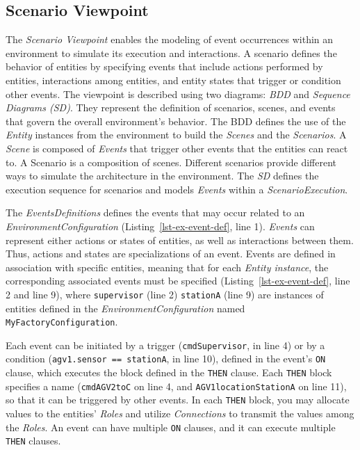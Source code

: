 \subsection{Scenario Viewpoint} \label{vp-sce}

The \textit{Scenario Viewpoint} enables the modeling of event occurrences within an environment to simulate its execution and interactions. A scenario defines the behavior of entities by specifying events that include actions performed by entities, interactions among entities, and entity states that trigger or condition other events. The viewpoint is described using two diagrams: \textit{BDD} and \textit{Sequence Diagrams (SD)}. They represent the definition of scenarios, scenes, and events that govern the overall environment's behavior. The BDD defines the use of the \textit{Entity} instances from the environment to build the \textit{Scenes} and the \textit{Scenarios}. A \textit{Scene} is composed of \textit{Events} that trigger other events that the entities can react to. A Scenario is a composition of scenes. Different scenarios provide different ways to simulate the architecture in the environment. The \textit{SD} defines the execution sequence for scenarios and models \textit{Events} within a \textit{ScenarioExecution}. 

The \textit{EventsDefinitions} defines the events that may occur related to an \textit{EnvironmentConfiguration} (Listing~\ref{lst-ex-event-def}, line 1). \textit{Events} can represent either actions or states of entities, as well as interactions between them. Thus, actions and states are specializations of an event. Events are defined in association with specific entities, meaning that for each \textit{Entity instance}, the corresponding associated events must be specified (Listing~\ref{lst-ex-event-def}, line 2 and line 9), where \texttt{supervisor} (line 2) \texttt{stationA} (line 9) are instances of entities defined in the \textit{EnvironmentConfiguration} named \texttt{MyFactoryConfiguration}. 

Each event can be initiated by a trigger (\texttt{cmdSupervisor}, in line 4) or by a condition (\texttt{agv1.sensor == stationA}, in line 10), defined in the event's \texttt{ON} clause, which executes the block defined in the \texttt{THEN} clause. 
Each \texttt{THEN} block specifies a name (\texttt{cmdAGV2toC} on line 4, and \texttt{AGV1locationStationA} on line 11), so that it can be triggered by other events.
In each \texttt{THEN} block, you may allocate values to the entities' \textit{Roles} and utilize \textit{Connections} to transmit the values among the \textit{Roles}.
An event can have multiple \texttt{ON} clauses, and it can execute multiple \texttt{THEN} clauses.

